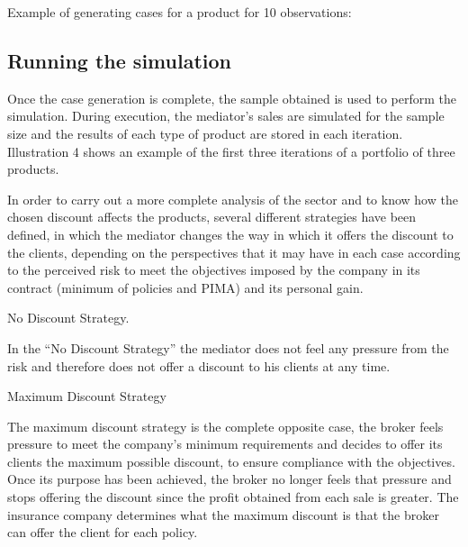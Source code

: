 \documentclass[review]{elsarticle}
\begin{document}
Example of generating cases for a product for 10 observations:

\subsection{Running the simulation}

Once the case generation is complete, the sample obtained is used to perform the simulation.
During execution, the mediator's sales are simulated for the sample size and the results of each type of product are stored in each iteration. Illustration 4 shows an example of the first three iterations of a portfolio of three products.


In order to carry out a more complete analysis of the sector and to know how the chosen discount affects the products, several different strategies have been defined, in which the mediator changes the way in which it offers the discount to the clients, depending on the perspectives that it may have in each case according to the perceived risk to meet the objectives imposed by the company in its contract (minimum of policies and PIMA) and its personal gain.

No Discount Strategy.

In the “No Discount Strategy” the mediator does not feel any pressure from the risk and therefore does not offer a discount to his clients at any time.


Maximum Discount Strategy

The maximum discount strategy is the complete opposite case, the broker feels pressure to meet the company's minimum requirements and decides to offer its clients the maximum possible discount, to ensure compliance with the objectives.
Once its purpose has been achieved, the broker no longer feels that pressure and stops offering the discount since the profit obtained from each sale is greater.
The insurance company determines what the maximum discount is that the broker can offer the client for each policy.
\end{document}
